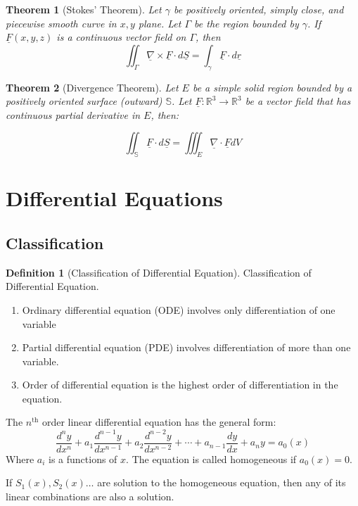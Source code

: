 \documentclass[12pt,a4paper]{article}
\newtheorem{theorem}{Theorem}[subsection]
\theoremstyle{definition}
\newtheorem{definition}{Definition}[section]
\theoremstyle{remark}
\begin{document}
\begin{theorem}[Stokes' Theorem]
	Let $\gamma$ be positively oriented, simply close, and piecewise smooth curve in $x,y$ plane.
	Let $ \Gamma$ be the region bounded by $\gamma$.
	If $ \underline{F}(x,y, z)$ is a continuous vector field on $\Gamma$, then
\[
	\iint _{\Gamma} \underline{\nabla} \times \underline{F} \cdot d\underline{S} = \int _{\gamma} \underline{F} \cdot d\underline{r}
\]

\end{theorem}

\begin{theorem}[Divergence Theorem]
Let $E$ be a simple solid region bounded by a positively oriented surface (outward) $\mathbb{S}$.
Let $ \underline{F}: \mathbb{R}^3 \rightarrow \mathbb{R}^3$ be a vector field that has continuous partial derivative in $E$, then:

\[
	\iint _{\mathbb{S}} \underline{F} \cdot d\underline{S} = \iiint _{E} \underline{\nabla} \cdot \underline{F} dV
\]


\end{theorem}


\section{Differential Equations}
\subsection{Classification}
\begin{definition}[Classification of Differential Equation]
Classification of Differential Equation.
	\begin{enumerate}
		\item Ordinary differential equation (ODE) involves only differentiation of one variable
		\item Partial differential equation (PDE) involves differentiation of more than one variable.
		\item Order of differential equation is the highest order of differentiation in the equation.
	\end{enumerate}
The $n^{\text{th}}$ order linear differential equation has the general form:
\[
	\frac{d^n y}{dx^n} + a_1 \frac{d^{n-1} y}{dx^{n-1}} + a_2 \frac{d^{n-2} y}{dx^{n-2}} + \cdots + a_{n-1} \frac{d y}{dx} + a_n y = a_0(x)
\]
Where $a_i$ is a functions of $x$. 
The equation is called homogeneous if $a_0(x) = 0$.

If $S_1(x), S_2(x) \dots $ are solution to the homogeneous equation, then any of its linear combinations are also a solution.
\end{definition}
\end{document}
